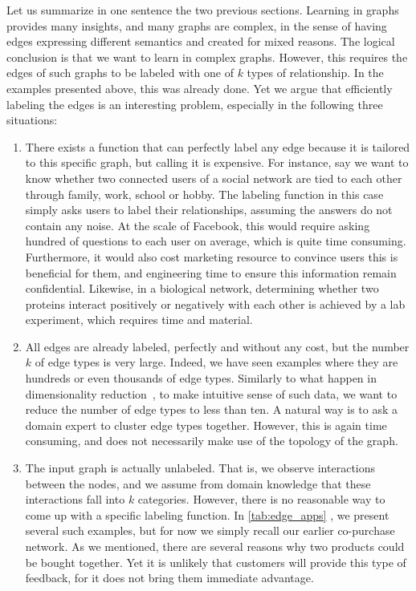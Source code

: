 Let us summarize in one sentence the two previous sections. Learning in graphs provides many
insights, and many graphs are complex, in the sense of having edges expressing different semantics
and created for mixed reasons. The logical conclusion is that we want to learn in complex graphs.
However, this requires the edges of such graphs to be labeled with one of $k$ types of relationship.
In the examples presented above, this was already done. Yet we argue that efficiently labeling the
edges is an interesting problem, especially in the following three situations:

\begin{enumerate}

  \item There exists a function that can perfectly label any edge because it is tailored to this
    specific graph, but calling it is expensive. For instance, say we want to know whether two
    connected users of a social network are tied to each other through family, work, school or
    hobby. The labeling function in this case simply asks users to label their relationships,
    assuming the answers do not contain any noise. At the scale of Facebook, this would require
    asking hundred of questions to each user on average, which is quite time consuming. Furthermore,
    it would also cost marketing resource to convince users this is beneficial for them, and
    engineering time to ensure this information remain confidential. Likewise, in a biological
    network, determining whether two proteins interact positively or negatively with each other is
    achieved by a lab experiment, which requires time and material.

  \item All edges are already labeled, perfectly and without any cost, but the number $k$ of edge
    types is very large. Indeed, we have seen examples where they are hundreds or even thousands of
    edge types. Similarly to what happen in dimensionality
    reduction~\autocite{DimensionReduction10}, to make intuitive sense of such data, we want to
    reduce the number of edge types to less than ten. A natural way is to ask a domain expert to
    cluster edge types together. However, this is again time consuming, and does not necessarily
    make use of the topology of the graph.

  \item The input graph is actually unlabeled. That is, we observe interactions between the nodes,
    and we assume from domain knowledge that these interactions fall into $k$ categories. However,
    there is no reasonable way to come up with a specific labeling function. In
    \autoref{tab:edge_apps} , we present several such examples, but for now
    we simply recall our earlier co-purchase network. As we mentioned, there are several reasons why
    two products could be bought together. Yet it is unlikely that customers will provide this type
    of feedback, for it does not bring them immediate advantage.
\end{enumerate}

